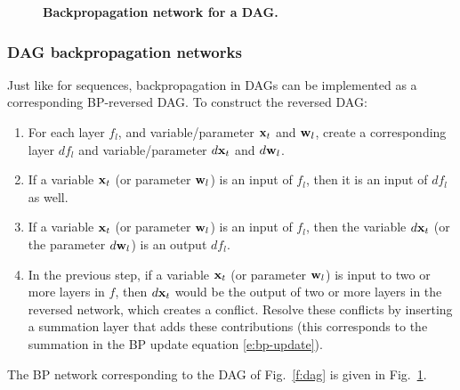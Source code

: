 \begin{figure}[t]
\begin{center}
	\end{center}
	\vspace{-1em}
	\caption{\textbf{Backpropagation network for a DAG.}}\label{f:dagbp}
\end{figure}

\subsubsection{DAG backpropagation networks}\label{s:bpnets-dag}

Just like for sequences, backpropagation in DAGs can be implemented as a corresponding BP-reversed DAG. To construct the reversed DAG:
\begin{enumerate}
	\item For each layer $f_l$, and variable/parameter $\mathbf{x}_t$ and $\mathbf{w}_l$, create a corresponding layer $df_l$ and variable/parameter $d\mathbf{x}_t$ and $d\mathbf{w}_l$.
	\item If a variable $\mathbf{x}_t$ (or parameter $\mathbf{w}_l$) is an input of $f_l$, then it is an input of $df_l$ as well.
	\item If a variable $\mathbf{x}_t$ (or parameter $\mathbf{w}_l$) is an input of $f_l$, then the variable $d\mathbf{x}_t$ (or the parameter $d\mathbf{w}_l$) is an output $df_l$.
	\item In the previous step, if a variable $\mathbf{x}_t$ (or parameter $\mathbf{w}_l$) is input to two or more layers in $f$, then $d\mathbf{x}_t$ would be the output of two or more layers in the reversed network, which creates a conflict. Resolve these conflicts by inserting a summation layer that adds these contributions (this corresponds to the summation in the BP update equation \eqref{e:bp-update}).
\end{enumerate}
The BP network corresponding to the DAG of Fig.~\ref{f:dag} is given in Fig.~\ref{f:dagbp}.

